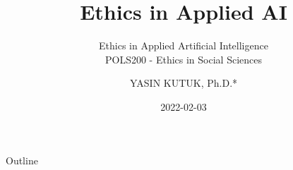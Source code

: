 \documentclass{beamer}
\begin{document}
\title{Ethics in Applied AI}

\subtitle{Ethics in Applied Artificial Intelligence\\
POLS200 - Ethics in Social Sciences}

\author{YASIN KUTUK, Ph.D.*}




\date{2022-02-03}


\subject{Course Presentation}







\begin{frame}
  \titlepage
\end{frame}





\begin{frame}{Outline}
  \tableofcontents
\end{frame}
\end{document}
